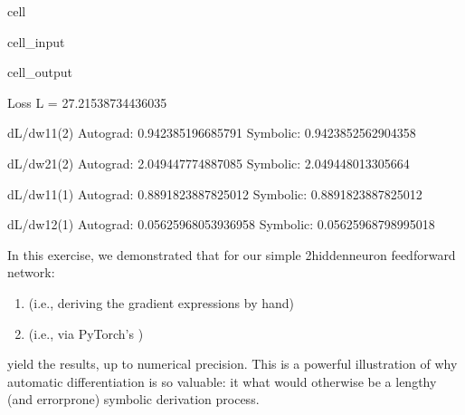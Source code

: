 \documentclass[letterpaper,10pt,english]{jupyterBook}
\begin{document}
\begin{sphinxuseclass}{cell}
\begin{sphinxVerbatimInput}
\begin{sphinxuseclass}{cell_input}
\end{sphinxuseclass}\end{sphinxVerbatimInput}
\begin{sphinxVerbatimOutput}

\begin{sphinxuseclass}{cell_output}
\begin{sphinxVerbatim}[commandchars=\\\{\}]
Loss L = 27.21538734436035

\PYGZhy{}\PYGZhy{}\PYGZhy{} dL/dw11\PYGZca{}(2) \PYGZhy{}\PYGZhy{}\PYGZhy{}
Auto\PYGZhy{}grad: 0.942385196685791 	 Symbolic: 0.9423852562904358

\PYGZhy{}\PYGZhy{}\PYGZhy{} dL/dw21\PYGZca{}(2) \PYGZhy{}\PYGZhy{}\PYGZhy{}
Auto\PYGZhy{}grad: 2.049447774887085 	 Symbolic: 2.049448013305664

\PYGZhy{}\PYGZhy{}\PYGZhy{} dL/dw11\PYGZca{}(1) \PYGZhy{}\PYGZhy{}\PYGZhy{}
Auto\PYGZhy{}grad: \PYGZhy{}0.8891823887825012 	 Symbolic: \PYGZhy{}0.8891823887825012

\PYGZhy{}\PYGZhy{}\PYGZhy{} dL/dw12\PYGZca{}(1) \PYGZhy{}\PYGZhy{}\PYGZhy{}
Auto\PYGZhy{}grad: \PYGZhy{}0.05625968053936958 	 Symbolic: \PYGZhy{}0.05625968798995018
\end{sphinxVerbatim}

\end{sphinxuseclass}\end{sphinxVerbatimOutput}

\end{sphinxuseclass}
\sphinxAtStartPar
In this exercise, we demonstrated that for our simple 2\sphinxhyphen{}hidden\sphinxhyphen{}neuron feedforward network:
\begin{enumerate}
%
\item {} 
\sphinxAtStartPar
{} (i.e., deriving the gradient expressions by hand)

\item {} 
\sphinxAtStartPar
{} (i.e., via PyTorch’s )

\end{enumerate}

\sphinxAtStartPar
yield the  results, up to numerical precision. This is a powerful illustration of why automatic differentiation is so valuable: it  what would otherwise be a lengthy (and error\sphinxhyphen{}prone) symbolic derivation process.
\end{document}
